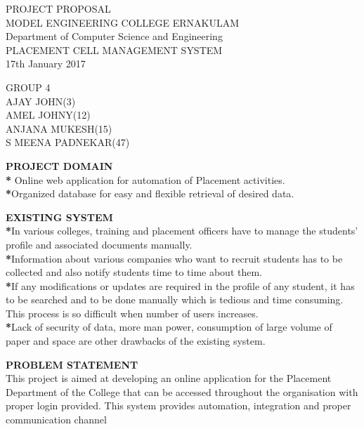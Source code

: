 \documentclass{beamer}
\begin{document}
\begin{frame}
\begin{center}
\Huge{PROJECT PROPOSAL}\\[20pt]
\large{MODEL ENGINEERING COLLEGE ERNAKULAM\\[5pt]Department of Computer Science and Engineering}\\[5pt]
\large{\color{blue}PLACEMENT CELL MANAGEMENT SYSTEM}\\[6pt]
17th January 2017
\end{center}
\begin{flushright}
\large{GROUP 4\\AJAY JOHN(3)\\AMEL JOHNY(12)\\ANJANA MUKESH(15)\\S MEENA PADNEKAR(47)}
\end{flushright}
\end{frame}
\begin{frame}
\begin{flushleft}
\Large{\textbf{PROJECT DOMAIN}}\\[20pt]
\textbf{*} Online web application for automation of Placement activities. \\
\textbf{*}Organized database for easy and flexible retrieval of desired data.  
\end{flushleft}
\end{frame}
\begin{frame}
\begin{flushleft}
\Large{\textbf{EXISTING SYSTEM}} \\[20pt]
\normalsize{\textbf{*}In various colleges, training and placement officers have to manage the students’ profile and associated documents manually.}\\
\normalsize{\textbf{*}Information about various companies who want to recruit students has to be collected and also notify students time to time about them.}\\
\normalsize{\textbf{*}If any modifications or updates are required in the profile of any student, it has to be searched and to be done manually which is tedious and time consuming. This process is so difficult when number of users increases.}\\
\normalsize{\textbf{*}Lack of security of data, more man power, consumption of large volume of paper and space are other drawbacks of the existing system.}
\end{flushleft}
\end{frame}
\begin{frame}
\begin{flushleft}
\Large{\textbf{PROBLEM STATEMENT} }\\[20pt]
\normalsize{This project is aimed at developing an online application for the Placement Department of the College that can be accessed throughout the organisation with proper login provided. This system provides automation, integration and proper communication channel}
\end{flushleft}
\end{frame}
\end{document}
